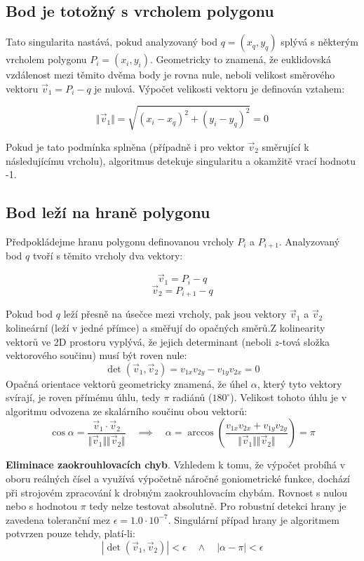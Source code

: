 \documentclass[12pt, a4paper]{article}
\begin{document}
\subsection{\textbf{Bod je totožný s vrcholem polygonu}}
Tato singularita nastává, pokud analyzovaný bod $q = (x_q, y_q)$ splývá s některým vrcholem polygonu $P_i = (x_i, y_i)$. Geometricky to znamená, že euklidovská vzdálenost mezi těmito dvěma body je rovna nule, neboli velikost směrového vektoru $\vec{v}_1 = P_i - q$ je nulová. Výpočet velikosti vektoru je definován vztahem:

$$\Vert \vec{v}_1 \Vert = \sqrt{(x_i - x_q)^2 + (y_i - y_q)^2} = 0$$

Pokud je tato podmínka splněna (případně i pro vektor $\vec{v}_2$ směrující k 
ná\-sle\-du\-jí\-cí\-mu vrcholu), algoritmus detekuje singularitu a okamžitě vrací hodnotu -1.

\subsection{\textbf{Bod leží na hraně polygonu}}
Předpokládejme hranu polygonu definovanou vrcholy $P_i$ a $P_{i+1}$. Analyzovaný bod $q$ tvoří s těmito vrcholy dva vektory: 

$$\vec{v}_1 = P_i - q$$ 
$$\vec{v}_2 = P_{i+1} - q$$

Pokud bod $q$ leží přesně na úsečce mezi vrcholy, pak jsou vektory $\vec{v}_1$ a $\vec{v}_2$ kolineární (leží v jedné přímce) a směřují do opačných směrů.Z kolinearity vektorů ve 2D prostoru vyplývá, že jejich determinant (neboli $z$-tová složka vektorového součinu) musí být roven nule:$$\det(\vec{v}_1, \vec{v}_2) = v_{1x}v_{2y} - v_{1y}v_{2x} = 0$$Opačná orientace vektorů geometricky znamená, že úhel $\alpha$, který tyto vektory svírají, je roven přímému úhlu, tedy $\pi$ radiánů ($180^\circ$). Velikost tohoto úhlu je v algoritmu odvozena ze skalárního součinu obou vektorů:
$$\cos \alpha = \frac{\vec{v}_1 \cdot \vec{v}_2}{\Vert \vec{v}_1 \Vert \Vert \vec{v}_2 \Vert} \quad \implies \quad \alpha = \arccos\left( \frac{v_{1x}v_{2x} + v_{1y}v_{2y}}{\Vert \vec{v}_1 \Vert \Vert \vec{v}_2 \Vert} \right) = \pi$$

\textbf{Eliminace zaokrouhlovacích chyb}. Vzhledem k tomu, že výpočet probíhá v oboru reálných čísel a využívá výpočetně náročné goniometrické funkce, dochází při strojovém zpracování k drobným zaokrouhlovacím chybám. Rovnost s nulou nebo s hodnotou $\pi$ tedy nelze testovat absolutně. Pro robustní detekci hrany je zavedena toleranční mez $\epsilon = 1.0 \cdot 10^{-7}$. Singulární případ hrany je algoritmem potvrzen pouze tehdy, platí-li:$$|\det(\vec{v}_1, \vec{v}_2)| < \epsilon \quad \land \quad |\alpha - \pi| < \epsilon$$
\end{document}
